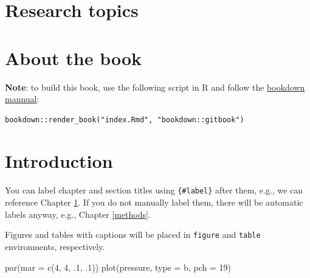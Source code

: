 \documentclass[
]{book}
\newenvironment{Shaded}{\begin{snugshade}}{\end{snugshade}}
\newcommand{\AttributeTok}[1]{\textcolor[rgb]{0.77,0.63,0.00}{#1}}
\newcommand{\DecValTok}[1]{\textcolor[rgb]{0.00,0.00,0.81}{#1}}
\newcommand{\FunctionTok}[1]{\textcolor[rgb]{0.00,0.00,0.00}{#1}}
\newcommand{\NormalTok}[1]{#1}
\newcommand{\StringTok}[1]{\textcolor[rgb]{0.31,0.60,0.02}{#1}}
\begin{document}
\hypertarget{research-topics}{%
\chapter*{Research topics}\label{research-topics}}

\hypertarget{about-the-book}{%
\chapter*{About the book}\label{about-the-book}}

\textbf{Note}: to build this book, use the following script in R and follow the \href{https://bookdown.org/yihui/bookdown/}{bookdown mannual}:

\begin{verbatim}
bookdown::render_book("index.Rmd", "bookdown::gitbook")
\end{verbatim}

\hypertarget{intro}{%
\chapter{Introduction}\label{intro}}

You can label chapter and section titles using \texttt{\{\#label\}} after them, e.g., we can reference Chapter \ref{intro}. If you do not manually label them, there will be automatic labels anyway, e.g., Chapter \ref{methods}.

Figures and tables with captions will be placed in \texttt{figure} and \texttt{table} environments, respectively.

\begin{Shaded}
\begin{Highlighting}[]
\FunctionTok{par}\NormalTok{(}\AttributeTok{mar =} \FunctionTok{c}\NormalTok{(}\DecValTok{4}\NormalTok{, }\DecValTok{4}\NormalTok{, .}\DecValTok{1}\NormalTok{, .}\DecValTok{1}\NormalTok{))}
\FunctionTok{plot}\NormalTok{(pressure, }\AttributeTok{type =} \StringTok{\textquotesingle{}b\textquotesingle{}}\NormalTok{, }\AttributeTok{pch =} \DecValTok{19}\NormalTok{)}
\end{Highlighting}
\end{Shaded}
\end{document}
